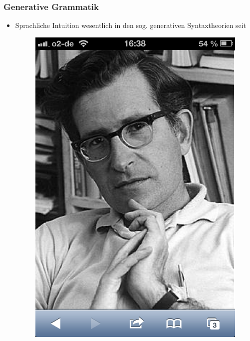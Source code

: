 \begin{frame}
\frametitle{Generative Grammatik}

\begin{itemize}

	\item Sprachliche Intuition \ras wesentlich in den sog. generativen Syntaxtheorien seit \citet{Chomsky57x}

\begin{figure}
\centering
	\includegraphics[scale=.17]{material/03chomsky}
\end{figure}

	
\end{itemize}

\end{frame}


